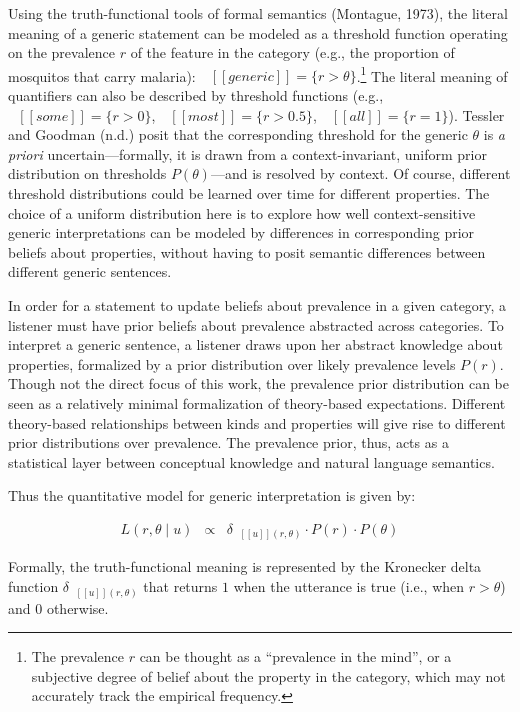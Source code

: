 \documentclass[,man,floatsintext]{apa6}
\let\rmarkdownfootnote\footnote%
\def\footnote{\protect\rmarkdownfootnote}
\theoremstyle{definition}
\theoremstyle{definition}
\theoremstyle{definition}
\theoremstyle{remark}
\begin{document}
Using the truth-functional tools of formal semantics (Montague, 1973),
the literal meaning of a generic statement can be modeled as a threshold
function operating on the prevalence \(r\) of the feature in the
category (e.g., the proportion of mosquitos that carry malaria):
\(\mbox{ $[\![ generic ]\!]$} = \{r > \theta\}\).\footnote{The
  prevalence \(r\) can be thought as a \enquote{prevalence in the mind},
  or a subjective degree of belief about the property in the category,
  which may not accurately track the empirical frequency.} The literal
meaning of quantifiers can also be described by threshold functions
(e.g., \(\mbox{ $[\![ some ]\!]$} = \{r > 0\}\),
\(\mbox{ $[\![ most ]\!]$} = \{r > 0.5\}\),
\(\mbox{ $[\![ all ]\!]$} = \{r = 1\}\)). Tessler and Goodman (n.d.)
posit that the corresponding threshold for the generic \(\theta\) is
\emph{a priori} uncertain---formally, it is drawn from a
context-invariant, uniform prior distribution on thresholds
\(P(\theta)\)---and is resolved by context. Of course, different
threshold distributions could be learned over time for different
properties. The choice of a uniform distribution here is to explore how
well context-sensitive generic interpretations can be modeled by
differences in corresponding prior beliefs about properties, without
having to posit semantic differences between different generic
sentences.

In order for a statement to update beliefs about prevalence in a given
category, a listener must have prior beliefs about prevalence abstracted
across categories. To interpret a generic sentence, a listener draws
upon her abstract knowledge about properties, formalized by a prior
distribution over likely prevalence levels \(P(r)\). Though not the
direct focus of this work, the prevalence prior distribution can be seen
as a relatively minimal formalization of theory-based expectations.
Different theory-based relationships between kinds and properties will
give rise to different prior distributions over prevalence. The
prevalence prior, thus, acts as a statistical layer between conceptual
knowledge and natural language semantics.

Thus the quantitative model for generic interpretation is given by:

\begin{eqnarray}
L(r, \theta \mid u) &\propto& {\delta_{\mbox{ $[\![ u ]\!]$}(r, \theta)} \cdot P(r) \cdot P(\theta)} \label{eq:L0}
\end{eqnarray}

Formally, the truth-functional meaning is represented by the Kronecker
delta function \(\delta_{\mbox{ $[\![ u ]\!]$}(r, \theta)}\) that
returns \(1\) when the utterance is true (i.e., when \(r > \theta\)) and
\(0\) otherwise.
\end{document}
